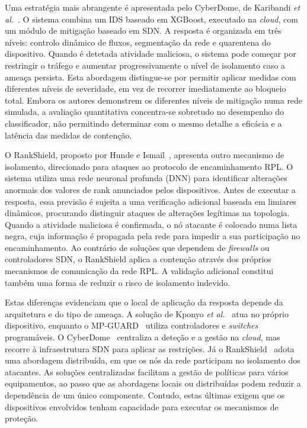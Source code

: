 \documentclass[conference,a4paper]{IEEEtran}
\begin{document}
Uma estratégia mais abrangente é apresentada pelo CyberDome, de Karibandi \textit{et al.}~\cite{karibandi2025cyberdome}. O sistema combina um IDS baseado em XGBoost, executado na \textit{cloud}, com um módulo de mitigação baseado em SDN. A resposta é organizada em três níveis: controlo dinâmico de fluxos, segmentação da rede e quarentena do dispositivo. Quando é detetada atividade maliciosa, o sistema pode começar por restringir o tráfego e aumentar progressivamente o nível de isolamento caso a ameaça persista. Esta abordagem distingue-se por permitir aplicar medidas com diferentes níveis de severidade, em vez de recorrer imediatamente ao bloqueio total. Embora os autores demonstrem os diferentes níveis de mitigação numa rede simulada, a avaliação quantitativa concentra-se sobretudo no desempenho do classificador, não permitindo determinar com o mesmo detalhe a eficácia e a latência das medidas de contenção.

O RankShield, proposto por Hunde e Ismail~\cite{hunde2026rankshield}, apresenta outro mecanismo de isolamento, direcionado para ataques ao protocolo de encaminhamento RPL. O sistema utiliza uma rede neuronal profunda (DNN) para identificar alterações anormais dos valores de rank anunciados pelos dispositivos. Antes de executar a resposta, essa previsão é sujeita a uma verificação adicional baseada em limiares dinâmicos, procurando distinguir ataques de alterações legítimas na topologia. Quando a atividade maliciosa é confirmada, o nó atacante é colocado numa lista negra, cuja informação é propagada pela rede para impedir a sua participação no encaminhamento. Ao contrário de soluções que dependem de \textit{firewalls} ou controladores SDN, o RankShield aplica a contenção através dos próprios mecanismos de comunicação da rede RPL. A validação adicional constitui também uma forma de reduzir o risco de isolamento indevido.

Estas diferenças evidenciam que o local de aplicação da resposta depende da arquitetura e do tipo de ameaça. A solução de Kponyo \textit{et al.}~\cite{kponyo2020lightweight} atua no próprio dispositivo, enquanto o MP-GUARD~\cite{elsayed2024mpguard} utiliza controladores e \textit{switches} programáveis. O CyberDome~\cite{karibandi2025cyberdome} centraliza a deteção e a gestão na \textit{cloud}, mas recorre à infraestrutura SDN para aplicar as restrições. Já o RankShield~\cite{hunde2026rankshield} adota uma abordagem distribuída, em que os nós da rede participam no isolamento dos atacantes. As soluções centralizadas facilitam a gestão de políticas para vários equipamentos, ao passo que as abordagens locais ou distribuídas podem reduzir a dependência de um único componente. Contudo, estas últimas exigem que os dispositivos envolvidos tenham capacidade para executar os mecanismos de proteção.
\end{document}
